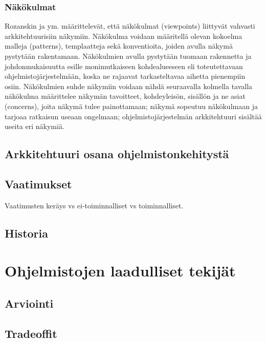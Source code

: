 \documentclass[finnish]{tktltiki2}
\theoremstyle{definition}
\theoremstyle{remark}
\begin{document}
\subsubsection{Näkökulmat}
Rozanskin ja ym. \citep[s. 36-42]{Rozanski:2011:SSA:2072649} määrittelevät, että näkökulmat (viewpoints) liittyvät vahvasti arkkitehtuurisiin näkymiin. Näkökulma voidaan määritellä olevan kokoelma malleja (patterns), templaatteja sekä konventioita, joiden avulla näkymä pystytään rakentamaan. Näkökulmien avulla pystytään tuomaan rakennetta ja johdonmukaisuutta esille monimutkaiseen kohdealueeseen eli toteutettavaan ohjelmistojärjestelmään, koska ne rajaavat tarkasteltavaa aihetta pienempiin osiin. Näkökulmien suhde näkymiin voidaan nähdä seuraavalla kolmella tavalla näkökulma määrittelee näkymän tavoitteet, kohdeyleisön, sisällön ja ne asiat (concerns), joita näkymä tulee painottamaan; näkymä sopeutuu näkökulmaan ja tarjoaa ratkaisun useaan ongelmaan; ohjelmistojärjestelmän arkkitehtuuri sisältää useita eri näkymiä.







\subsection{Arkkitehtuuri osana ohjelmistonkehitystä}


\subsection{Vaatimukset}
Vaatimusten keräys vs ei-toiminnalliset vs toiminnalliset.



\subsection{Historia}


\section{Ohjelmistojen laadulliset tekijät}
\subsection{Arviointi}
\subsection{Tradeoffit}
\end{document}
